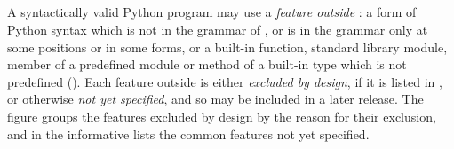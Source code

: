 \subsection{}
\label{sec:features-outside}

\begin{AddedBlock}
A syntactically valid Python program may use a \emph{feature outside \PurePy}: a form of Python syntax which is not
in the grammar of , or is in the grammar only at some positions or in some forms, or a built-in
function, standard library module, member of a predefined module or method of a built-in type which is not predefined
(). Each feature outside \PurePy is either \emph{excluded by design}, if it is listed in
, or otherwise \emph{not yet specified}, and so may be included in a later release. The
figure groups the features excluded by design by the reason for their exclusion, and  in
the informative  lists the common features not yet specified.
\end{AddedBlock}


